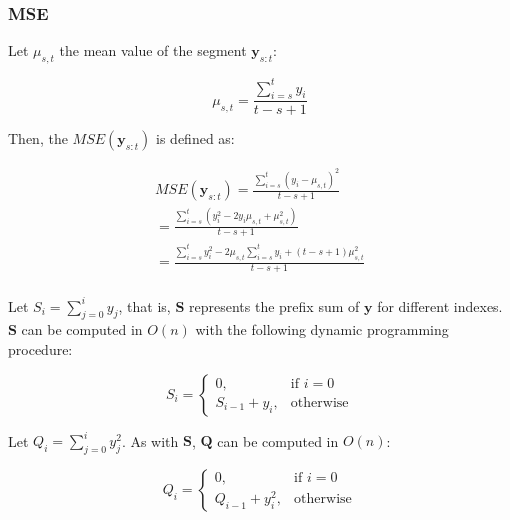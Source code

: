 \subsubsection{MSE}

Let $\mu_{s, t}$ the mean value of the segment $\mathbf{y}_{s : t}$:

\begin{equation}
    \mu_{s, t} = \frac{\sum \limits_{i = s}^{t} y_{i}}{t - s + 1}
\end{equation}

Then, the $MSE(\mathbf{y}_{s : t})$ is defined as:

\begin{equation}
    \begin{aligned}
        MSE(\mathbf{y}_{s : t}) = \frac{\sum \limits_{i = s}^{t} (y_{i} - \mu_{s, t})^{2}}{t - s + 1} \\
        = \frac{\sum \limits_{i = s}^{t} (y_{i}^{2} - 2 y_{i} \mu_{s, t} + \mu_{s, t}^{2})}{t - s + 1} \\
        = \frac{\sum \limits_{i = s}^{t} y_{i}^{2} - 2 \mu_{s, t} \sum \limits_{i = s}^{t} y_{i} + (t - s + 1) \mu_{s, t}^{2}}{t - s + 1} \\
    \end{aligned}
\end{equation}

Let $S_{i} = \sum \limits_{j = 0}^{i} y_{j}$, that is, $\mathbf{S}$ represents the prefix sum of $\mathbf{y}$ for different indexes. $\mathbf{S}$ can be computed in $O(n)$ with the following dynamic programming procedure: 

\begin{equation}
    S_{i} = 
    \begin{cases}
        0, & \text{if } i = 0 \\
        S_{i - 1} + y_{i}, & \text{otherwise}
    \end{cases}
\end{equation}

Let $Q_{i} = \sum \limits_{j = 0}^{i} y_{j}^{2}$. As with $\mathbf{S}$, $\mathbf{Q}$ can be computed in $O(n)$: 

\begin{equation}
    Q_{i} = 
    \begin{cases}
        0, & \text{if } i = 0 \\
        Q_{i - 1} + y_{i}^{2}, & \text{otherwise}
    \end{cases}
\end{equation}

